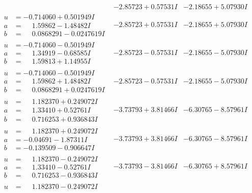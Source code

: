 \documentclass[1p]{elsarticle_modified}
\theoremstyle{definition}
\begin{document}
$$\begin{array}{c|c|c}
 & -2.85723 + 0.57531 I & -2.18655 + 5.07930 I \\ \hline\begin{aligned}
u &= -0.714060 + 0.501949 I \\
a &= \phantom{-}1.59862 - 1.48482 I \\
b &= \phantom{-}0.0868291 - 0.0247619 I\end{aligned}
 & -2.85723 + 0.57531 I & -2.18655 + 5.07930 I \\ \hline\begin{aligned}
u &= -0.714060 - 0.501949 I \\
a &= \phantom{-}1.34919 - 0.68585 I \\
b &= \phantom{-}1.59813 + 1.14955 I\end{aligned}
 & -2.85723 - 0.57531 I & -2.18655 - 5.07930 I \\ \hline\begin{aligned}
u &= -0.714060 - 0.501949 I \\
a &= \phantom{-}1.59862 + 1.48482 I \\
b &= \phantom{-}0.0868291 + 0.0247619 I\end{aligned}
 & -2.85723 - 0.57531 I & -2.18655 - 5.07930 I \\ \hline\begin{aligned}
u &= \phantom{-}1.182370 + 0.249072 I \\
a &= \phantom{-}1.33410 + 0.52761 I \\
b &= \phantom{-}0.716253 + 0.936843 I\end{aligned}
 & -3.73793 + 3.81466 I & -6.30765 - 8.57961 I \\ \hline\begin{aligned}
u &= \phantom{-}1.182370 + 0.249072 I \\
a &= -0.04691 - 1.87311 I \\
b &= -0.139509 - 0.906647 I\end{aligned}
 & -3.73793 + 3.81466 I & -6.30765 - 8.57961 I \\ \hline\begin{aligned}
u &= \phantom{-}1.182370 - 0.249072 I \\
a &= \phantom{-}1.33410 - 0.52761 I \\
b &= \phantom{-}0.716253 - 0.936843 I\end{aligned}
 & -3.73793 - 3.81466 I & -6.30765 + 8.57961 I \\ \hline\begin{aligned}
u &= \phantom{-}1.182370 - 0.249072 I \\

\end{aligned}
\end{array}$$
\end{document}
